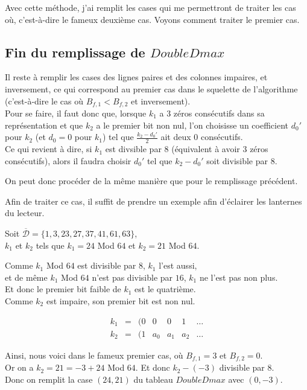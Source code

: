\documentclass[12pt, a4paper]{memoir}
\newcommand{\dbarre}{\overline{\mathcal{D}}}
\begin{document}
      Avec cette méthode, j'ai remplit les cases qui me permettront de traiter les cas où, c'est-à-dire le fameux deuxième cas.
      Voyons comment traiter le premier cas.
      
    \subsection{Fin du remplissage de $DoubleDmax$}
    
      Il reste à remplir les cases des lignes paires et des colonnes impaires, et inversement, ce qui correspond au premier cas dans le squelette 
      de l'algorithme (c'est-à-dire le cas où $B_{f,1} < B_{f,2}$ et inversement). \\
      Pour se faire, il faut donc que, lorsque $k_1$ a $3$ zéros consécutifs dans sa représentation et que $k_2$ a le premier bit non nul,
      l'on choisisse un coefficient $d_0'$ pour $k_2$ (et $d_0 = 0$ pour $k_1$) tel que $\frac{k_2 - d_0'}{2}$ ait deux $0$ consécutifs. \\
      Ce qui revient à dire, si $k_1$ est divsible par $8$ (équivalent à avoir $3$ zéros consécutifs), alors il faudra choisir $d_0'$ tel que
      $k_2 - d_0'$ soit divisible par $8$.
      
      On peut donc procéder de la même manière que pour le remplissage précédent.
      
      Afin de traiter ce cas, il suffit de prendre un exemple afin d'éclairer les lanternes du lecteur.
      
      Soit $\dbarre = \{1,3,23,27,37,41,61,63\}$, \\
      $k_1$ et $k_2$ tels que $k_1 = 24$ Mod $64$ et $k_2 = 21$ Mod $64$.
      
      Comme $k_1$ Mod $64$ est divisible par $8$, $k_1$ l'est aussi, \\
      et de même $k_1$ Mod $64$ n'est pas divisible par $16$, $k_1$ ne l'est pas non plus. \\
      Et donc le premier bit faible de $k_1$ est le quatrième. \\
      Comme $k_2$ est impaire, son premier bit est non nul.
      
 $$\begin{array}{ccccccc}
  k_1 & = & (0 & 0 & 0 & 1 & \ldots \\
  k_2 & = & (1 & a_0 & a_1 & a_2 & \ldots
 \end{array}$$
    
      Ainsi, nous voici dans le fameux premier cas, où $B_{f,1} = 3$ et $B_{f,2} = 0$. \\
      Or on a $k_2 = 21 = -3 + 24$ Mod $64$. Et donc $k_2 - (-3)$ divisible par $8$. \\
      Donc on remplit la case $(24,21)$ du tableau $DoubleDmax$ avec $(0,-3)$.
      
\end{document}
